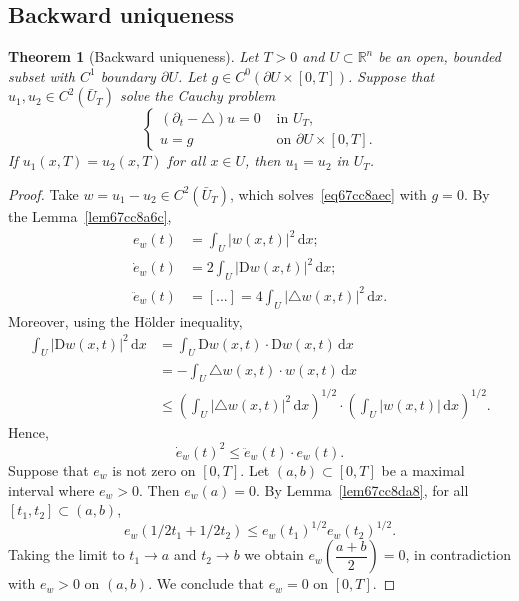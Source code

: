 \documentclass[a4paper,9pt]{amsart}
\newcommand{\R}{\mathbb{R}}	%
\newcommand{\did}{\,\mathrm{d}}	%
\newcommand{\de}{\partial}		%
\newcommand{\Diff}{\mathrm{D}}
\newcommand{\laplacian}{\triangle}
\theoremstyle{plain}
\newtheorem{theorem}[proposition]{Theorem}
\theoremstyle{definition}
\theoremstyle{remark}
\begin{document}
\subsection{Backward uniqueness}\label{subs67cc8a9b}

\begin{theorem}[Backward uniqueness]
	Let $T>0$ and $U\subset\R^n$ be an open, bounded subset with $C^1$ boundary $\de U$.
	Let $g\in C^0(\de U\times[0,T])$.
	Suppose that $u_1,u_2\in C^2(\bar U_T)$ solve the Cauchy problem
	\begin{equation}\label{eq67cc8aec}
	\begin{cases}
		(\de_t-\laplacian)u = 0 & \text{ in }U_T , \\
		u = g & \text{ on }\de U\times[0,T] .
	\end{cases}
	\end{equation}
	If $u_1(x,T) = u_2(x,T)$ for all $x\in U$, then $u_1=u_2$ in $U_T$.
\end{theorem}
\begin{proof}
	Take $w=u_1-u_2 \in C^2(\bar U_T)$, which solves~\eqref{eq67cc8aec} with $g=0$.
	By the Lemma~\ref{lem67cc8a6c}, 
	\begin{align*}
		e_w(t) &= \int_U |w(x,t)|^2 \did x ; \\
		\dot e_w(t) &= 2 \int_U |\Diff w(x,t)|^2 \did x ; \\
		\ddot e_w(t) &= [...] = 4 \int_U | \laplacian w(x,t)|^2 \did x .
	\end{align*}
	Moreover, using the Hölder inequality,
	\begin{align*}
		\int_U | \Diff w(x,t) |^2 \did x
		&= \int_U \Diff w(x,t)\cdot \Diff w(x,t) \did x \\
		&= - \int_U \laplacian w(x,t) \cdot w(x,t) \did x \\
		&\le \left(\int_U |\laplacian w(x,t)|^2 \did x\right)^{1/2}
			\cdot \left(\int_U |w(x,t)| \did x\right)^{1/2} .
	\end{align*}
	Hence, 
	\begin{equation}
		\dot e_w(t)^2 \le \ddot e_w(t) \cdot e_w(t) .
	\end{equation}
	Suppose that $e_w$ is not zero on $[0,T]$.
	Let $(a,b)\subset[0,T]$ be a maximal interval where $e_w>0$.
	Then $e_w(a) = 0$.
	By Lemma~\ref{lem67cc8da8}, for all $[t_1,t_2]\subset(a,b)$,
	\begin{equation}
		e_w(1/2 t_1 + 1/2 t_2 ) 
		\le e_w(t_1)^{1/2} e_w(t_2)^{1/2} .
	\end{equation}
	Taking the limit to $t_1\to a$ and $t_2\to b$ we obtain $e_w(\dfrac{a+b}{2}) = 0$, in contradiction with $e_w>0$ on $(a,b)$.
	We conclude that $e_w=0$ on $[0,T]$.
\end{proof}
\end{document}

